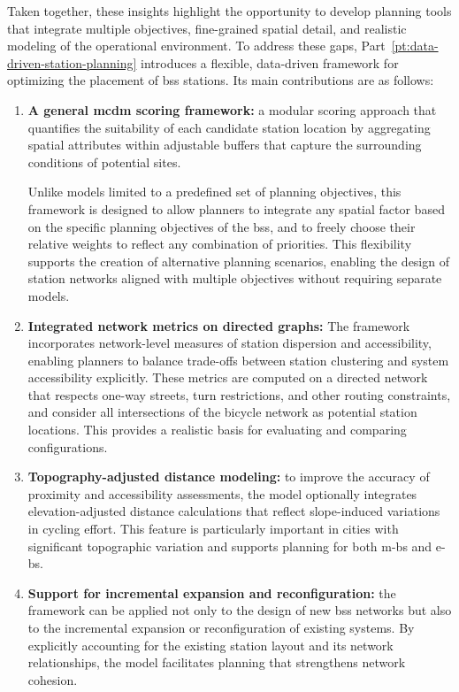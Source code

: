 Taken together, these insights highlight the opportunity to develop planning tools that integrate multiple objectives, fine-grained spatial detail, and realistic modeling of the operational environment. To address these gaps, Part~\ref{pt:data-driven-station-planning} introduces a flexible, data-driven framework for optimizing the placement of \ac{bss} stations. Its main contributions are as follows: 

\begin{enumerate}
    \item  \textbf{A general \ac{mcdm} scoring framework:} a modular scoring approach that quantifies the suitability of each candidate station location by aggregating spatial attributes within adjustable buffers that capture the surrounding conditions of potential sites. 
    
    Unlike models limited to a predefined set of planning objectives, this framework is designed to allow planners to integrate any spatial factor based on the specific planning objectives of the \ac{bss}, and to freely choose their relative weights to reflect any combination of priorities. This flexibility supports the creation of alternative planning scenarios, enabling the design of station networks aligned with multiple objectives without requiring separate models.

    \item \textbf{Integrated network metrics on directed graphs:} The framework incorporates network-level measures of station dispersion and accessibility, enabling planners to balance trade-offs between station clustering and system accessibility explicitly. These metrics are computed on a directed network that respects one-way streets, turn restrictions, and other routing constraints, and consider all intersections of the bicycle network as potential station locations. This provides a realistic basis for evaluating and comparing configurations.

    \item \textbf{Topography-adjusted distance modeling:} to improve the accuracy of proximity and accessibility assessments, the model optionally integrates elevation-adjusted distance calculations that reflect slope-induced variations in cycling effort. This feature is particularly important in cities with significant topographic variation and supports planning for both \acp{m-b} and \acp{e-b}.

    \item \textbf{Support for incremental expansion and reconfiguration:} the framework can be applied not only to the design of new \ac{bss} networks but also to the incremental expansion or reconfiguration of existing systems. By explicitly accounting for the existing station layout and its network relationships, the model facilitates planning that strengthens network cohesion.


\end{enumerate}
